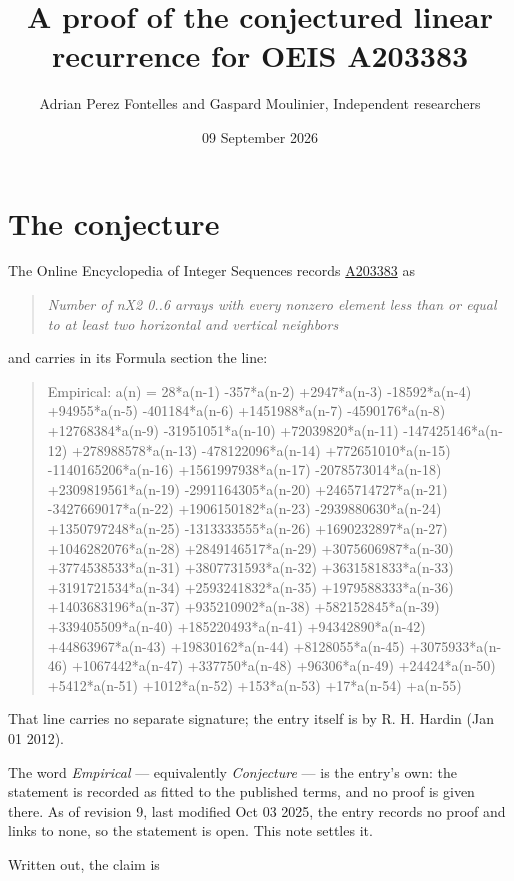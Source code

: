 \documentclass[11pt]{article}
\title{A proof of the conjectured linear recurrence for OEIS A203383}
\author{Adrian Perez Fontelles and Gaspard Moulinier, Independent researchers}
\date{09 September 2026}
\theoremstyle{definition}
\begin{document}
\maketitle
\section{The conjecture}

The Online Encyclopedia of Integer Sequences records \href{https://oeis.org/A203383}{A203383} as

\begin{quote}\itshape Number of nX2 0..6 arrays with every nonzero element less than or equal to at least two horizontal and vertical neighbors\end{quote}

and carries in its Formula section the line:

\begin{quote}\ttfamily Empirical: a(n) = 28*a(n-1) -357*a(n-2) +2947*a(n-3) -18592*a(n-4) +94955*a(n-5) -401184*a(n-6) +1451988*a(n-7) -4590176*a(n-8) +12768384*a(n-9) -31951051*a(n-10) +72039820*a(n-11) -147425146*a(n-12) +278988578*a(n-13) -478122096*a(n-14) +772651010*a(n-15) -1140165206*a(n-16) +1561997938*a(n-17) -2078573014*a(n-18) +2309819561*a(n-19) -2991164305*a(n-20) +2465714727*a(n-21) -3427669017*a(n-22) +1906150182*a(n-23) -2939880630*a(n-24) +1350797248*a(n-25) -1313333555*a(n-26) +1690232897*a(n-27) +1046282076*a(n-28) +2849146517*a(n-29) +3075606987*a(n-30) +3774538533*a(n-31) +3807731593*a(n-32) +3631581833*a(n-33) +3191721534*a(n-34) +2593241832*a(n-35) +1979588333*a(n-36) +1403683196*a(n-37) +935210902*a(n-38) +582152845*a(n-39) +339405509*a(n-40) +185220493*a(n-41) +94342890*a(n-42) +44863967*a(n-43) +19830162*a(n-44) +8128055*a(n-45) +3075933*a(n-46) +1067442*a(n-47) +337750*a(n-48) +96306*a(n-49) +24424*a(n-50) +5412*a(n-51) +1012*a(n-52) +153*a(n-53) +17*a(n-54) +a(n-55)\end{quote}

That line carries no separate signature; the entry itself is by R. H. Hardin (Jan 01 2012).

The word {\itshape Empirical} --- equivalently {\itshape Conjecture} --- is the entry's own: the statement is recorded as fitted to the published terms, and no proof is given there. As of revision 9, last modified Oct 03 2025, the entry records no proof and links to none, so the statement is open. This note settles it.

Written out, the claim is
\end{document}
